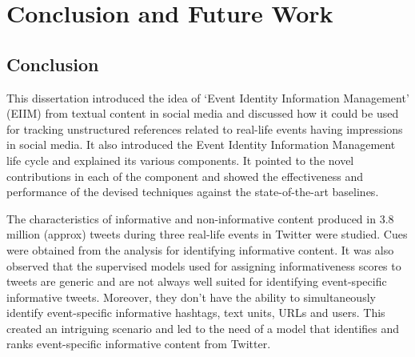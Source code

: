 
\chapter{Conclusion and Future Work} %
\thispagestyle{fancy}
\label{Conclusion} %

\doublespacing
\setlength{\parindent}{1cm}
\section{Conclusion}
This dissertation introduced the idea of `Event Identity Information Management' (EIIM) from textual content in social media and discussed how it could be used for tracking unstructured references related to real-life events having impressions in social media. It also introduced the Event Identity Information Management life cycle and explained its various components. It pointed to the novel contributions in each of the component and showed the effectiveness and performance of the devised techniques against the state-of-the-art baselines. 

The characteristics of informative and non-informative content produced in 3.8 million (approx) tweets during three real-life events in Twitter were studied. Cues were obtained from the analysis for identifying informative content. It was also observed that the supervised models used for assigning informativeness scores to tweets are generic and are not always well suited for identifying event-specific informative tweets. Moreover, they don't have the ability to simultaneously identify event-specific informative hashtags, text units, URLs and users. This created an intriguing scenario and led to the need of a model that identifies and ranks event-specific informative content from Twitter.

